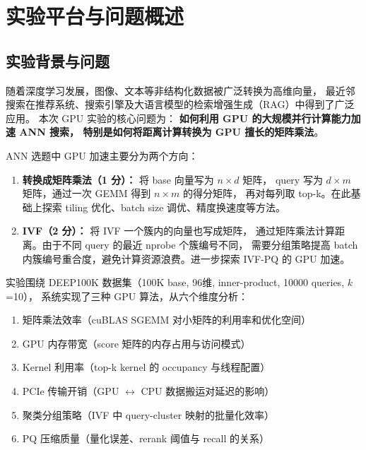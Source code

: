 \documentclass[UTF8,a4paper,10pt]{ctexart}
\begin{document}
\tableofcontents
\newpage
\setcounter{page}{1}

\section{实验平台与问题概述}

\subsection{实验背景与问题}

随着深度学习发展，图像、文本等非结构化数据被广泛转换为高维向量，
最近邻搜索在推荐系统、搜索引擎及大语言模型的检索增强生成（RAG）中得到了广泛应用。
本次 GPU 实验的核心问题为：
\textbf{如何利用 GPU 的大规模并行计算能力加速 ANN 搜索，
特别是如何将距离计算转换为 GPU 擅长的矩阵乘法}。

ANN 选题中 GPU 加速主要分为两个方向：
\begin{enumerate}[itemsep=0pt]
\item \textbf{转换成矩阵乘法（1 分）：} 将 base 向量写为 $n \times d$ 矩阵，
query 写为 $d \times m$ 矩阵，通过一次 GEMM 得到 $n \times m$ 的得分矩阵，
再对每列取 top-k。在此基础上探索 tiling 优化、batch size 调优、精度换速度等方法。
\item \textbf{IVF（2 分）：} 将 IVF 一个簇内的向量也写成矩阵，
通过矩阵乘法计算距离。由于不同 query 的最近 nprobe 个簇编号不同，
需要分组策略提高 batch 内簇编号重合度，避免计算资源浪费。进一步探索 IVF-PQ 的 GPU 加速。
\end{enumerate}

实验围绕 DEEP100K 数据集（100K base, 96维, inner-product, 10000 queries, $k$=10），
系统实现了三种 GPU 算法，从六个维度分析：

\begin{enumerate}[itemsep=0pt]
\item 矩阵乘法效率（cuBLAS SGEMM 对小矩阵的利用率和优化空间）
\item GPU 内存带宽（score 矩阵的内存占用与访问模式）
\item Kernel 利用率（top-k kernel 的 occupancy 与线程配置）
\item PCIe 传输开销（GPU $\leftrightarrow$ CPU 数据搬运对延迟的影响）
\item 聚类分组策略（IVF 中 query-cluster 映射的批量化效率）
\item PQ 压缩质量（量化误差、rerank 阈值与 recall 的关系）
\end{enumerate}
\end{document}
